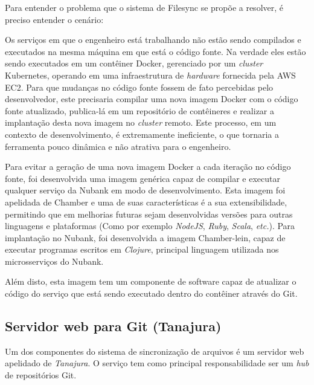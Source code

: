 \documentclass[twosideprint]{politex}
\newcommand{\legend}[1]{\begin{center}\def\caption{}\caption{#1}\end{center}}
\begin{document}
	Para entender o problema que o sistema de Filesync se propõe a resolver, é preciso entender o cenário:
	
	Os serviços em que o engenheiro está trabalhando não estão sendo compilados e executados na mesma máquina em que está o código fonte. Na verdade eles estão sendo executados em um contêiner Docker, gerenciado por um \textit{cluster} Kubernetes, operando em uma infraestrutura de \textit{hardware} fornecida pela AWS EC2. Para que mudanças no código fonte fossem de fato percebidas pelo desenvolvedor, este precisaria compilar uma nova imagem Docker com o código fonte atualizado, publica-lá em um repositório de contêineres e realizar a implantação desta nova imagem no \textit{cluster} remoto. Este processo, em um contexto de desenvolvimento, é extremamente ineficiente, o que tornaria a ferramenta pouco dinâmica e não atrativa para o engenheiro.

	Para evitar a geração de uma nova imagem Docker a cada iteração no código fonte, foi desenvolvida uma imagem genérica capaz de compilar e executar qualquer serviço da Nubank em modo de desenvolvimento. Esta imagem foi apelidada de Chamber e uma de suas características é a sua extensibilidade, permitindo que em melhorias futuras sejam desenvolvidas versões para outras linguagens e plataformas (Como por exemplo \textit{NodeJS}, \textit{Ruby}, \textit{Scala}, \textit{etc.}). Para implantação no Nubank, foi desenvolvida a imagem Chamber-lein, capaz de executar programas escritos em \textit{Clojure}, principal linguagem utilizada nos microsserviços do Nubank.
	
	Além disto, esta imagem tem um componente de software capaz de atualizar o código do serviço que está sendo executado dentro do contêiner através do Git.
	
	
	\subsection{Servidor web para Git (Tanajura)}
	Um dos componentes do sistema de sincronização de arquivos é um servidor web apelidado de \textit{Tanajura}. O serviço tem como principal responsabilidade ser um \textit{hub} de repositórios Git.
	
\end{document}
